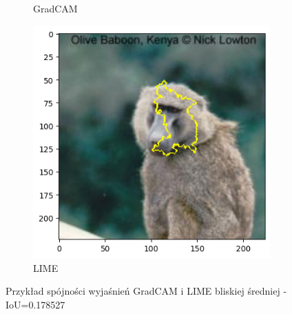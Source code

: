 \begin{figure}[h]
\begin{subfigure}[b]{0.3\textwidth}
		\caption{GradCAM}  \label{}
	\end{subfigure}
	\begin{subfigure}[b]{0.3\textwidth}
		\centering\includegraphics[width=.9\textwidth]{img/examples/appendix/n02486410_08484_lime}
		\caption{LIME}
	\end{subfigure}
	\caption{Przykład spójności wyjaśnień GradCAM i LIME bliskiej średniej - IoU=0.178527}
	\label{}
\end{figure}
